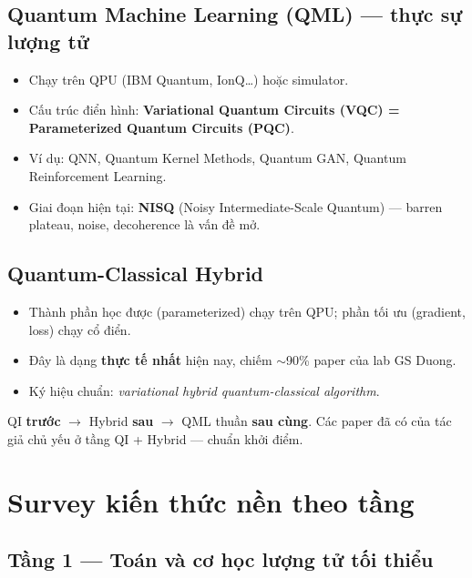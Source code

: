 \documentclass[11pt,a4paper]{article}
\begin{document}
\subsection{Quantum Machine Learning (QML) --- thực sự lượng tử}
\begin{itemize}
  \item Chạy trên QPU (IBM Quantum, IonQ\dots) hoặc simulator.
  \item Cấu trúc điển hình: \textbf{Variational Quantum Circuits (VQC) = Parameterized Quantum Circuits (PQC)}.
  \item Ví dụ: QNN, Quantum Kernel Methods, Quantum GAN, Quantum Reinforcement Learning.
  \item Giai đoạn hiện tại: \textbf{NISQ} (Noisy Intermediate-Scale Quantum) --- barren plateau, noise, decoherence là vấn đề mở.
\end{itemize}

\subsection{Quantum-Classical Hybrid}
\begin{itemize}
  \item Thành phần học được (parameterized) chạy trên QPU; phần tối ưu (gradient, loss) chạy cổ điển.
  \item Đây là dạng \textbf{thực tế nhất} hiện nay, chiếm $\sim$90\% paper của lab GS Duong.
  \item Ký hiệu chuẩn: \textit{variational hybrid quantum-classical algorithm}.
\end{itemize}

\begin{keybox}
QI \textbf{trước} $\rightarrow$ Hybrid \textbf{sau} $\rightarrow$ QML thuần \textbf{sau cùng}. Các paper đã có của tác giả chủ yếu ở tầng QI + Hybrid --- chuẩn khởi điểm.
\end{keybox}

\section{Survey kiến thức nền theo tầng}

\subsection{Tầng 1 --- Toán và cơ học lượng tử tối thiểu}
\end{document}
